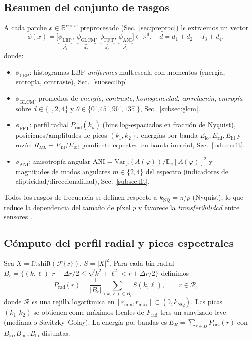 \subsection{Resumen del conjunto de rasgos}
A cada parche $x\in\mathbb{R}^{w\times w}$ preprocesado (Sec.~\ref{sec:preproc}) le extraemos un vector
\[
\phi(x)=\big[\underbrace{\phi_{\text{LBP}}}_{d_1},\ 
\underbrace{\phi_{\text{GLCM}}}_{d_2},\ 
\underbrace{\phi_{\text{FFT}}}_{d_3},\
\underbrace{\phi_{\text{ANI}}}_{d_4}\big]\in\mathbb{R}^{d},\quad d=d_1+d_2+d_3+d_4,
\]
donde:
\begin{itemize}
\item $\phi_{\text{LBP}}$: histogramas LBP \emph{uniformes} multiescala con momentos (energía, entropía, contraste), Sec.~\ref{subsec:lbp}.
\item $\phi_{\text{GLCM}}$: promedios de \emph{energía}, \emph{contraste}, \emph{homogeneidad}, \emph{correlación}, \emph{entropía} sobre $d\in\{1,2,4\}$ y $\theta\in\{0^\circ,45^\circ,90^\circ,135^\circ\}$, Sec.~\ref{subsec:glcm}.
\item $\phi_{\text{FFT}}$: perfil radial $P_{\mathrm{rad}}(k_\rho)$ (bins log-espaciados en fracción de Nyquist), posiciones/amplitudes de picos $(k_1,k_2)$, energías por banda $E_\text{lo},E_\text{mi},E_\text{hi}$ y razón $R_{HL}=E_\text{hi}/E_\text{lo}$; pendiente espectral en banda inercial, Sec.~\ref{subsec:fft}.
\item $\phi_{\text{ANI}}$: anisotropía angular $\mathrm{ANI}=\mathrm{Var}_\varphi(A(\varphi))/\mathbb{E}_\varphi[A(\varphi)]^2$ y magnitudes de modos angulares $m\in\{2,4\}$ del espectro (indicadores de elipticidad/direccionalidad), Sec.~\ref{subsec:fft}.
\end{itemize}
Todos los rasgos de frecuencia se definen respecto a $k_\mathrm{NQ}=\pi/p$ (Nyquist), lo que reduce la dependencia del tamaño de píxel $p$ y favorece la \emph{transferibilidad} entre sensores \cite{Chen2022Photonics}.

\subsection{Cómputo del perfil radial y picos espectrales}
Sea $X=\mathrm{fftshift}(\mathcal{F}\{x\})$, $S=|X|^2$. Para cada bin radial $B_r=\{(k,\ell): r-\Delta r/2\le \sqrt{k^2+\ell^2}<r+\Delta r/2\}$ definimos
\begin{equation}
P_{\mathrm{rad}}(r)=\frac{1}{|B_r|}\sum_{(k,\ell)\in B_r}S(k,\ell),\qquad r\in\mathcal{R},
\end{equation}
donde $\mathcal{R}$ es una rejilla logarítmica en $[r_{\min},r_{\max}]\subset(0,k_\mathrm{NQ})$. Los picos $(k_1,k_2)$ se obtienen como máximos locales de $P_{\mathrm{rad}}$ tras un suavizado leve (mediana o Savitzky–Golay). La energía por bandas es $E_B=\sum_{r\in B}P_{\mathrm{rad}}(r)$ con $B_{\text{lo}},B_{\text{mi}},B_{\text{hi}}$ disjuntas. 

